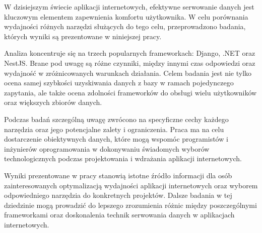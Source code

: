 W dzisiejszym świecie aplikacji internetowych, efektywne serwowanie danych jest kluczowym elementem zapewnienia komfortu użytkownika.
W celu porównania wydajności różnych narzędzi służących do tego celu, przeprowadzono badania, których wyniki są prezentowane w niniejszej pracy.

Analiza koncentruje się na trzech popularnych frameworkach: Django, .NET oraz NestJS.
Brane pod uwagę są różne czynniki, między innymi czas odpowiedzi oraz wydajność w zróżnicowanych warunkach działania.
Celem badania jest nie tylko ocena samej szybkości uzyskiwania danych z bazy w ramach pojedynczego zapytania, ale także ocena zdolności frameworków do obsługi wielu użytkowników oraz większych zbiorów danych.

Podczas badań szczególną uwagę zwrócono na specyficzne cechy każdego narzędzia oraz jego potencjalne zalety i ograniczenia. Praca ma na celu dostarczenie obiektywnych danych, które mogą wspomóc programistów i inżynierów oprogramowania w dokonywaniu świadomych wyborów technologicznych podczas projektowania i wdrażania aplikacji internetowych.

Wyniki prezentowane w pracy stanowią istotne źródło informacji dla osób zainteresowanych optymalizacją wydajności aplikacji internetowych oraz wyborem odpowiedniego narzędzia do konkretnych projektów.
Dalsze badania w tej dziedzinie mogą prowadzić do lepszego zrozumienia różnic między poszczególnymi frameworkami oraz doskonalenia technik serwowania danych w aplikacjach internetowych.
